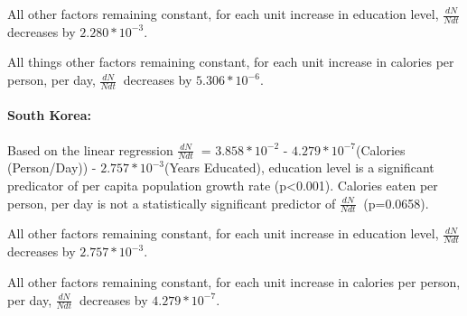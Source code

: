 \documentclass[]{article}
\let\oldparagraph\paragraph
\renewcommand{\paragraph}[1]{\oldparagraph{#1}\mbox{}}
\begin{document}
All other factors remaining constant, for each unit increase in
education level, \(\frac{dN}{Ndt}\ \) decreases by \(2.280*10^{-3}\).

All things other factors remaining constant, for each unit increase in
calories per person, per day, \(\frac{dN}{Ndt}\ \) decreases by
\(5.306*10^{-6}\).

\paragraph{South Korea:}\label{south-korea}

Based on the linear regression \(\frac{dN}{Ndt}\ \) = \(3.858*10^{-2}\)
- \(4.279*10^{-7}\)(Calories (Person/Day)) - \(2.757*10^{-3}\)(Years
Educated), education level is a significant predicator of per capita
population growth rate (p\textless{}0.001). Calories eaten per person,
per day is not a statistically significant predictor of
\(\frac{dN}{Ndt}\ \) (p=0.0658).

All other factors remaining constant, for each unit increase in
education level, \(\frac{dN}{Ndt}\ \) decreases by \(2.757*10^{-3}\).

All other factors remaining constant, for each unit increase in calories
per person, per day, \(\frac{dN}{Ndt}\ \) decreases by
\(4.279*10^{-7}\).
\end{document}
